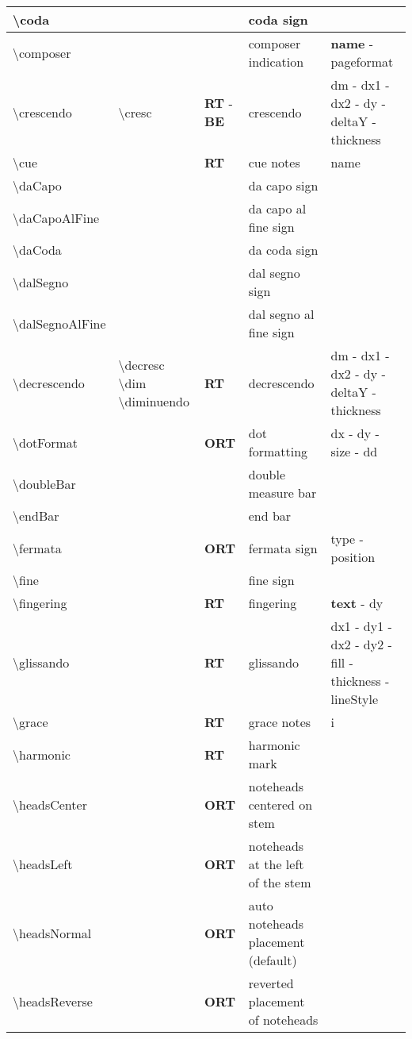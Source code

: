\documentclass[a4paper, landscape, 10pt]{article}
\begin{document}
\begin{tabularx}{\linewidth}{p{3cm}p{4.5cm}p{3cm}p{5.5cm}l}
    \hline
    \textbackslash{}coda&&&coda sign&\\
    \hline
    \textbackslash{}composer&&&composer indication&\textbf{name} - pageformat\\
    \hline
    \textbackslash{}crescendo&\textbackslash{}cresc&\textbf{RT} - \textbf{BE}&crescendo&dm - dx1 - dx2 - dy - deltaY - thickness\\
    \hline
    \textbackslash{}cue&&\textbf{RT}&cue notes&name\\
    \hline
    \textbackslash{}daCapo&&&da capo sign&\\
    \hline
    \textbackslash{}daCapoAlFine&&&da capo al fine sign&\\
    \hline
    \textbackslash{}daCoda&&&da coda sign&\\
    \hline
    \textbackslash{}dalSegno&&&dal segno sign&\\
    \hline
    \textbackslash{}dalSegnoAlFine&&&dal segno al fine sign&\\
    \hline
    \textbackslash{}decrescendo&\textbackslash{}decresc \textbackslash{}dim \textbackslash{}diminuendo&\textbf{RT}&decrescendo&dm - dx1 - dx2 - dy - deltaY - thickness\\
    \hline
    \textbackslash{}dotFormat&&\textbf{ORT}&dot formatting&dx - dy - size - dd\\
    \hline
    \textbackslash{}doubleBar&&&double measure bar&\\
    \hline
    \textbackslash{}endBar&&&end bar&\\
    \hline
    \textbackslash{}fermata&&\textbf{ORT}&fermata sign&type - position\\
    \hline
    \textbackslash{}fine&&&fine sign&\\
    \hline
    \textbackslash{}fingering&&\textbf{RT}&fingering&\textbf{text} - dy\\
    \hline
    \textbackslash{}glissando&&\textbf{RT}&glissando&dx1 - dy1 - dx2 - dy2 - fill - thickness - lineStyle\\
    \hline
    \textbackslash{}grace&&\textbf{RT}&grace notes&i\\
    \hline
    \textbackslash{}harmonic&&\textbf{RT}&harmonic mark&\\
    \hline
    \textbackslash{}headsCenter&&\textbf{ORT}&noteheads centered on stem&\\
    \hline
    \textbackslash{}headsLeft&&\textbf{ORT}&noteheads at the left of the stem&\\
    \hline
    \textbackslash{}headsNormal&&\textbf{ORT}&auto noteheads placement (default)&\\
    \hline
    \textbackslash{}headsReverse&&\textbf{ORT}&reverted placement of noteheads&\\
    \hline
\end{tabularx}
\end{document}
